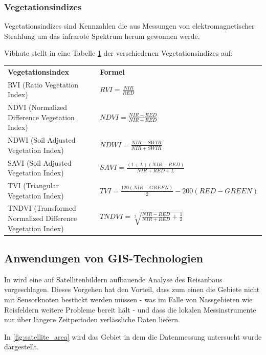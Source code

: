 \subsubsection{Vegetationsindizes} 
Vegetationsindizes sind Kennzahlen die aus Messungen von elektromagnetischer Strahlung um das infrarote Spektrum herum gewonnen werde.\cite{jour:Jackson1991}

Vibhute stellt in \cite{jour:Vibhute2013} eine Tabelle \ref{table:gsi_indices} der verschiedenen Vegetationsindizes auf:

\begin{table}[h]
\label{table:gsi_indices}
\begin{tabular}{|p{5cm}|p{9cm}|}
\textbf{Vegetationsindex}                                  & \textbf{Formel} \\
RVI (Ratio Vegetation Index)                               & $RVI = \frac{NIR}{RED}$                 \\
NDVI (Normalized Difference Vegetation Index)              & $NDVI = \frac{NIR - RED}{NIR + RED}$                \\
NDWI (Soil Adjusted Vegetation Index)                      & $NDWI = \frac{NIR - SWIR}{NIR + SWIR}$                \\
SAVI (Soil Adjusted Vegetation Index)                      & $SAVI = \frac{(1 + L)(NIR - RED)}{NIR + RED + L}$                \\
TVI (Triangular Vegetation Index)                          & $TVI = \frac{120 (NIR - GREEN)}{2} - 200 (RED - GREEN)$                \\
TNDVI (Transformed Normalized Difference Vegetation Index) & $TNDVI = \sqrt[2]{\frac{NIR - RED}{NIR + RED} + \frac{1}{2}}$               
\end{tabular}
\end{table}

\subsection{Anwendungen von GIS-Technologien}

In \cite{jour:Huang2013} wird eine auf Satellitenbildern aufbauende Analyse des Reisanbaus vorgeschlagen. Dieses Vorgehen hat den Vorteil, dass zum einen die Gebiete nicht mit Sensorknoten bestückt werden müssen - was im Falle von Nassgebieten wie Reisfeldern weitere Probleme bereit hält - und dass die lokalen Messinstrumente nur über längere Zeitperioden verlässliche Daten liefern.

In \ref{fig:satellite_area} wird das Gebiet in dem die Datenmessung untersucht wurde dargestellt.

